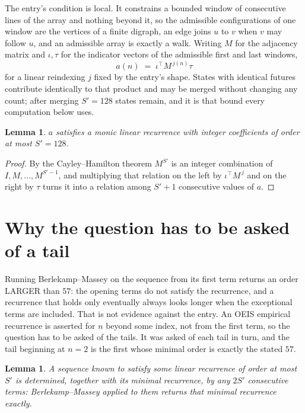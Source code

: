 \documentclass[11pt,a4paper]{article}
\theoremstyle{plain}
\newtheorem{lemma}[theorem]{Lemma}
\theoremstyle{definition}
\begin{document}
The entry's condition is local. It constrains a bounded window of consecutive lines of the
array and nothing beyond it, so the admissible configurations of one window are the vertices of
a finite digraph, an edge joins $u$ to $v$ when $v$ may follow $u$, and an admissible array is
exactly a walk. Writing $M$ for the adjacency matrix and $\iota,\tau$ for the indicator vectors
of the admissible first and last windows,
\[
a(n)\;=\;\iota^{\!\top}M^{\,j(n)}\tau
\]
for a linear reindexing $j$ fixed by the entry's shape. States with identical futures
contribute identically to that product and may be merged without changing any count; after
merging $S'=128$ states remain, and it is that bound every computation below uses.

\begin{lemma}\label{lem:cf}
$a$ satisfies a monic linear recurrence with integer coefficients of order at most $S'=128$.
\end{lemma}

\begin{proof}
By the Cayley--Hamilton theorem $M^{S'}$ is an integer combination of $I,M,\dots,M^{S'-1}$,
and multiplying that relation on the left by $\iota^{\!\top}M^{\,j}$ and on the right by
$\tau$ turns it into a relation among $S'+1$ consecutive values of $a$.
\end{proof}

\section{Why the question has to be asked of a tail}

Running Berlekamp--Massey on the sequence from its first term returns an order LARGER than $57$: the opening terms do not satisfy the recurrence, and a recurrence that holds only eventually always looks longer when the exceptional terms are included. That is not evidence against the entry. An OEIS empirical recurrence is asserted for $n$ beyond some index, not from the first term, so the question has to be asked of the tails. It was asked of each tail in turn, and the tail beginning at $n=2$ is the first whose minimal order is exactly the stated $57$.

\begin{lemma}\label{lem:bm}
A sequence known to satisfy some linear recurrence of order at most $S'$ is determined,
together with its minimal recurrence, by any $2S'$ consecutive terms: Berlekamp--Massey applied
to them returns that minimal recurrence exactly.
\end{lemma}
\end{document}
